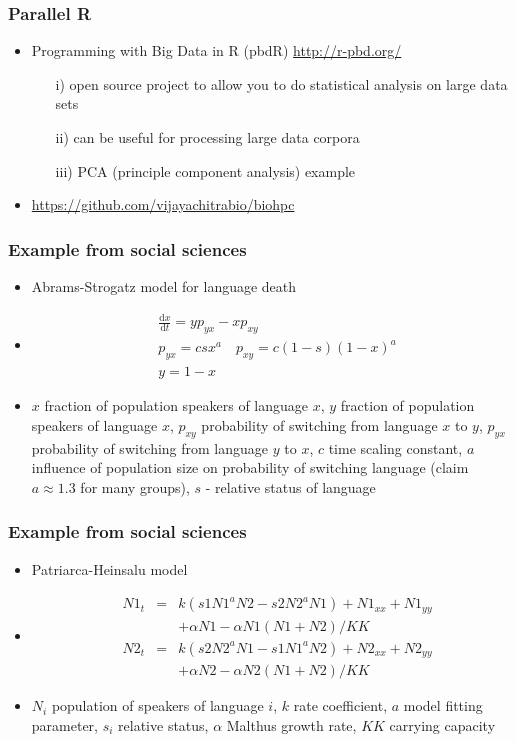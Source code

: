 \documentclass{beamer}
\begin{document}
\begin{frame}
\frametitle{Parallel R}
\begin{itemize}
\item Programming with Big Data in R (pbdR) \url{http://r-pbd.org/}
\begin{itemize}
\item[i)] open source project to allow you to do statistical analysis on large data sets
\item[ii)] can be useful for processing large data corpora
\item[iii)] PCA (principle component analysis) example
\end{itemize}
\item \url{https://github.com/vijayachitrabio/biohpc}
\end{itemize}
\end{frame}

\begin{frame}
\frametitle{Example from social sciences}
\begin{itemize}
\item Abrams-Strogatz model for language death
\item \begin{align*} 
&{} \frac{\mathrm{d}x}{\mathrm{d}t}=yp_{yx}-xp_{xy}\\
&{} p_{yx}=csx^a \quad p_{xy}=c(1-s)(1-x)^a\\
&{} y=1-x
\end{align*}
\item $x$ fraction of population speakers of  language $x$, $y$ fraction of population speakers of  language $x$, $p_{xy}$ probability of switching from language $x$ to $y$, $p_{yx}$ probability of switching from language $y$ to $x$, $c$ time scaling constant, $a$ influence of population size on probability of switching language (claim $a\approx1.3$ for many groups), $s$ - relative status of language 
\end{itemize}
\end{frame}

\begin{frame}
\frametitle{Example from social sciences}
\begin{itemize}
\item Patriarca-Heinsalu model 
\item \begin{align*}
&{} N1_t &=& k(s1 N1^a N2 - s2 N2^a N1) + N1_{xx}+N1_{yy} \\
&{} & &+ \alpha N1 - \alpha N1 (N1+N2)/KK
\\&{} N2_t &=& k(s2 N2^a N1 - s1 N1^a N2) + N2_{xx}+N2_{yy} \\
&{}   & &  + \alpha N2 - \alpha N2 (N1+N2)/KK
\end{align*} 
\item $N_i$ population of speakers of language $i$,  $k$ rate coefficient, $a$ model fitting parameter, $s_i$ relative status, $\alpha$ Malthus growth rate, $KK$ carrying capacity
\end{itemize}
\end{frame}
\end{document}
